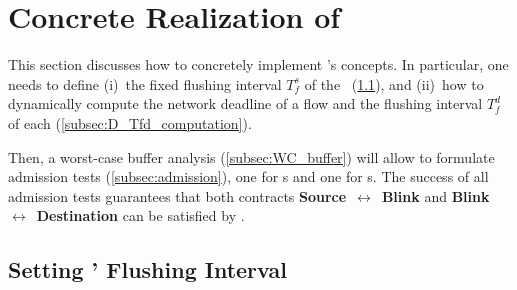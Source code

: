 
\section{Concrete Realization of \DRP}
\label{sec:concrete_realization}

This section discusses how to concretely implement \DRP's concepts. In particular, one needs to define
(i)~the fixed flushing interval $T_f^s$ of the \CPs~(\cref{subsec:CP_schedule}), and
(ii)~how to dynamically compute the network deadline \ndeadlinei of a flow \flowi and the flushing interval $T_f^d$ of each \ap (\cref{subsec:D_Tfd_computation}).

Then, a worst-case buffer analysis (\cref{subsec:WC_buffer}) will allow to formulate admission tests (\cref{subsec:admission}), one for {\ap}s and one for {\cp}s.
The success of all admission tests guarantees that both contracts \textbf{Source}~$\boldsymbol{\leftrightarrow}$~\textbf{Blink} and \textbf{Blink}~$\boldsymbol{\leftrightarrow}$~\textbf{Destination} can be satisfied by \DRP.

\subsection{Setting \CPs' Flushing Interval}\label{subsec:CP_schedule}

